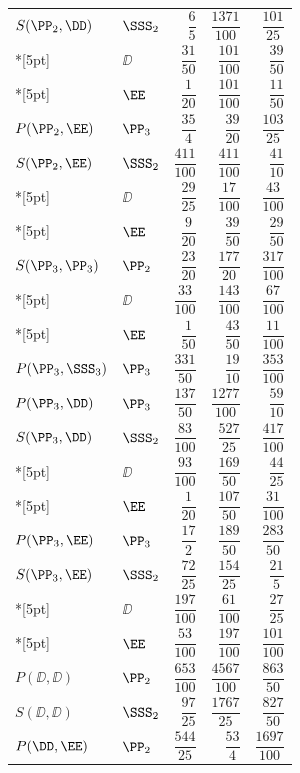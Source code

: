 \begin{longtable}{llrrr}
$S(\PP_2,\DD)$ & $\SSS_2$ & $\dfrac{6}{5}$ & $\dfrac{1371}{100}$ & $\dfrac{101}{25}$ \\*[5pt]
 & $\DD$ & $\dfrac{31}{50}$ & $\dfrac{101}{100}$ & $\dfrac{39}{50}$ \\*[5pt]
 & $\EE$ & $\dfrac{1}{20}$ & $\dfrac{101}{100}$ & $\dfrac{11}{50}$ \\[7pt]
$P(\PP_2,\EE)$ & $\PP_3$ & $\dfrac{35}{4}$ & $\dfrac{39}{20}$ & $\dfrac{103}{25}$ \\[7pt]
$S(\PP_2,\EE)$ & $\SSS_2$ & $\dfrac{411}{100}$ & $\dfrac{411}{100}$ & $\dfrac{41}{10}$ \\*[5pt]
 & $\DD$ & $\dfrac{29}{25}$ & $\dfrac{17}{100}$ & $\dfrac{43}{100}$ \\*[5pt]
 & $\EE$ & $\dfrac{9}{20}$ & $\dfrac{39}{50}$ & $\dfrac{29}{50}$ \\[7pt]
$S(\PP_3,\PP_3)$ & $\PP_2$ & $\dfrac{23}{20}$ & $\dfrac{177}{20}$ & $\dfrac{317}{100}$ \\*[5pt]
 & $\DD$ & $\dfrac{33}{100}$ & $\dfrac{143}{100}$ & $\dfrac{67}{100}$ \\*[5pt]
 & $\EE$ & $\dfrac{1}{50}$ & $\dfrac{43}{50}$ & $\dfrac{11}{100}$ \\[7pt]
$P(\PP_3,\SSS_3)$ & $\PP_3$ & $\dfrac{331}{50}$ & $\dfrac{19}{10}$ & $\dfrac{353}{100}$ \\[7pt]
$P(\PP_3,\DD)$ & $\PP_3$ & $\dfrac{137}{50}$ & $\dfrac{1277}{100}$ & $\dfrac{59}{10}$ \\[7pt]
$S(\PP_3,\DD)$ & $\SSS_2$ & $\dfrac{83}{100}$ & $\dfrac{527}{25}$ & $\dfrac{417}{100}$ \\*[5pt]
 & $\DD$ & $\dfrac{93}{100}$ & $\dfrac{169}{50}$ & $\dfrac{44}{25}$ \\*[5pt]
 & $\EE$ & $\dfrac{1}{20}$ & $\dfrac{107}{50}$ & $\dfrac{31}{100}$ \\[7pt]
$P(\PP_3,\EE)$ & $\PP_3$ & $\dfrac{17}{2}$ & $\dfrac{189}{50}$ & $\dfrac{283}{50}$ \\[7pt]
$S(\PP_3,\EE)$ & $\SSS_2$ & $\dfrac{72}{25}$ & $\dfrac{154}{25}$ & $\dfrac{21}{5}$ \\*[5pt]
 & $\DD$ & $\dfrac{197}{100}$ & $\dfrac{61}{100}$ & $\dfrac{27}{25}$ \\*[5pt]
 & $\EE$ & $\dfrac{53}{100}$ & $\dfrac{197}{100}$ & $\dfrac{101}{100}$ \\[7pt]
$P(\DD,\DD)$ & $\PP_2$ & $\dfrac{653}{100}$ & $\dfrac{4567}{100}$ & $\dfrac{863}{50}$ \\[7pt]
$S(\DD,\DD)$ & $\SSS_2$ & $\dfrac{97}{25}$ & $\dfrac{1767}{25}$ & $\dfrac{827}{50}$ \\[7pt]
$P(\DD,\EE)$ & $\PP_2$ & $\dfrac{544}{25}$ & $\dfrac{53}{4}$ & $\dfrac{1697}{100}$ \\[7pt]
\bottomrule
\end{longtable}
\endgroup
